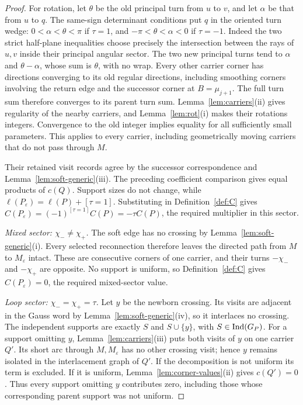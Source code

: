 \begin{proof}
For rotation, let $\theta$ be the old principal turn from $u$ to
$v$, and let $\alpha$ be that from $u$ to $q$. The same-sign
determinant conditions put $q$ in the oriented turn wedge:
$0<\alpha<\theta<\pi$ if $\tau=1$, and
$-\pi<\theta<\alpha<0$ if $\tau=-1$.
Indeed the two strict half-plane inequalities choose precisely
the intersection between the rays of $u,v$ inside their principal
angular sector. The two new principal turns tend to $\alpha$
and $\theta-\alpha$, whose sum is $\theta$, with no wrap.
Every other carrier corner has directions converging to its old
regular directions, including smoothing corners involving the
return edge and the successor corner at $B=\mu_{j+1}$.
The full turn sum therefore converges to its parent turn sum.
Lemma~\ref{lem:carriers}(ii) gives regularity of the nearby
carriers, and Lemma~\ref{lem:rot}(i) makes their rotations
integers. Convergence to the old integer implies equality for
all sufficiently small parameters. This applies to every carrier,
including geometrically moving carriers that do not pass through $M$.

Their retained visit records agree by the successor correspondence
and Lemma~\ref{lem:soft-generic}(iii). The preceding coefficient
comparison gives equal products of $c(Q)$. Support sizes do not
change, while $\ell(P_\varepsilon)=\ell(P)+[\tau=1]$.
Substituting in Definition~\ref{def:C} gives
$C(P_\varepsilon)=(-1)^{[\tau=1]}C(P)=-\tau C(P)$,
the required multiplier in this sector.

\emph{Mixed sector: $\chi_-\ne\chi_+$.}
The soft edge has no crossing by Lemma~\ref{lem:soft-generic}(i).
Every selected reconnection therefore leaves the directed path
from $M$ to $M_\varepsilon$ intact. These are consecutive corners
of one carrier, and their turns $-\chi_-$ and $-\chi_+$ are
opposite. No support is uniform, so Definition~\ref{def:C} gives
$C(P_\varepsilon)=0$, the required mixed-sector value.

\emph{Loop sector: $\chi_-=\chi_+=\tau$.}
Let $y$ be the newborn crossing. Its visits are adjacent in the
Gauss word by Lemma~\ref{lem:soft-generic}(iv), so it interlaces
no crossing. The independent supports are exactly $S$ and
$S\cup\{y\}$, with $S\in\operatorname{Ind}(G_P)$.
For a support omitting $y$, Lemma~\ref{lem:carriers}(iii) puts
both visits of $y$ on one carrier $Q'$. Its short arc through
$M,M_\varepsilon$ has no other crossing visit; hence $y$ remains
isolated in the interlacement graph of $Q'$. If the decomposition
is not uniform its term is excluded. If it is uniform,
Lemma~\ref{lem:corner-values}(ii) gives $c(Q')=0$.
Thus every support omitting $y$ contributes zero, including those
whose corresponding parent support was not uniform.


\end{proof}
